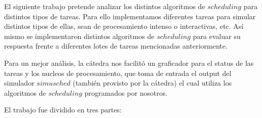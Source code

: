El siguiente trabajo pretende analizar los distintos algoritmos de $scheduling$ para distintos tipos de tareas. 
Para ello implementamos diferentes tareas para simular distintos tipos de ellas, sean de procesamiento intenso o interactivas, etc.
Así mismo se implementaron distintos algoritmos de $scheduling$ para evaluar su respuesta frente a diferentes lotes de tareas mencionadas anteriormente.

Para un mejor análisis, la cátedra nos facilitó un graficador para el status de las tareas y los nucleos de procesamiento, que toma de entrada el output del simulador $simusched$ (también provisto por la cátedra) el cual utiliza los algoritmos de $scheduling$ programados por nosotros.

El trabajo fue dividido en tres partes:
